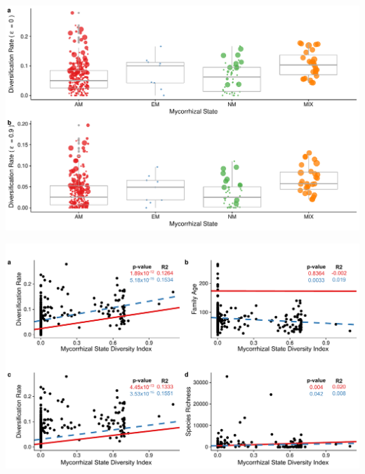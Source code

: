 \documentclass[12pt,]{article}
\begin{document}
\newpage

\includegraphics{../output/figs/boxplots_netdiv_myctype.pdf}

\newpage

\includegraphics{../output/figs/scatterplots_lm_pgls_stem_edited.pdf}
\end{document}
